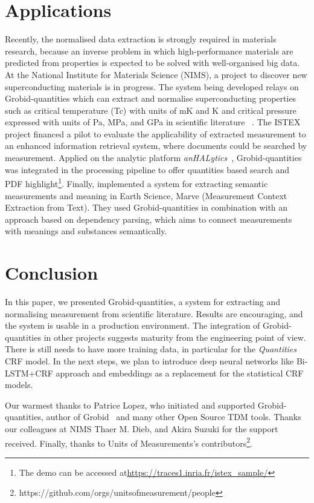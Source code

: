 \documentclass[sigconf]{acmart}
\begin{document}
\section{Applications}
\label{sec:use_cases}
Recently, the normalised data extraction is strongly required in materials research, because an inverse problem in which high-performance materials are predicted from properties is expected to be solved with well-organised big data. At the National Institute for Materials Science (NIMS), a project to discover new superconducting materials is in progress. The system being developed relays on Grobid-quantities which can extract and normalise superconducting properties such as critical temperature (Tc) with units of mK and K and critical pressure expressed with units of Pa, MPa, and GPa in scientific literature ~\cite{foppiano2019proposal}. The ISTEX~\cite{dazy2014istex} project financed a pilot to evaluate the applicability of extracted measurement to an enhanced information retrieval system, where documents could be searched by measurement. Applied on the analytic platform \textit{anHALytics}~\cite{anHALytics}, Grobid-quantities was integrated in the processing pipeline to offer quantities based search and PDF highlight\footnote{The demo can be accessed at\url{https://traces1.inria.fr/istex_sample/}}. Finally, \cite{hundman2017measurement} implemented a system for extracting semantic measurements and meaning in Earth Science, Marve (Measurement Context Extraction from Text). They used Grobid-quantities in combination with an approach based on dependency parsing, which aims to connect measurements with meanings and substances semantically.  

\section{Conclusion}
\label{sec:conclusion}
In this paper, we presented Grobid-quantities, a system for extracting and normalising measurement from scientific literature. Results are encouraging, and the system is usable in a production environment. The integration of Grobid-quantities in other projects suggests maturity from the engineering point of view. There is still needs to have more training data, in particular for the \textit{Quantities} CRF model. In the next steps, we plan to introduce deep neural networks like Bi-LSTM+CRF approach and embeddings as a replacement for the statistical CRF models. 

\begin{acks}
Our warmest thanks to Patrice Lopez, who initiated and supported Grobid-quantities, author of Grobid~\cite{GROBID} and many other Open Source TDM tools. Thanks our colleagues at NIMS Thaer M. Dieb, and Akira Suzuki for the support received. Finally, thanks to Units of Measurements's contributors\footnote{https://github.com/orgs/unitsofmeasurement/people}.
\end{acks}




\end{document}
